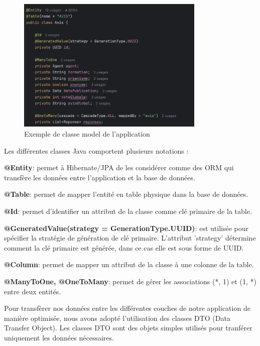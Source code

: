         \begin{figure}[h!]
            \centering
            \includegraphics[width=0.8\textwidth]{images/code/avisEntity.png}
            \caption{Exemple de classe model de l'application}
        \end{figure}\medskip

        Les différentes classes Java comportent plusieurs notations :
        \medskip
        
        \textbf{@Entity}: permet à Hibernate/JPA de les considérer comme des ORM qui transfère les données entre l'application et la base de données.
        \medskip

        \textbf{@Table}: permet de mapper l'entité en table physique dans la base de données.
        \medskip

        \textbf{@Id}: permet d'identifier un attribut de la classe comme clé primaire de la table.
        \medskip

        \textbf{@GeneratedValue(strategy = GenerationType.UUID)}: est utilisée pour spécifier la stratégie de génération de clé primaire. L'attribut 'strategy' détermine comment la clé primaire est générée, dans ce cas elle est sous forme de UUID.\medskip

        \textbf{@Column}: permet de mapper un attribut de la classe à une colonne de la table.
        \medskip

        \textbf{@ManyToOne, @OneToMany}: permet de gérer les associations (*, 1) et (1, *) entre deux entités.
        \vspace{1cm}

        Pour transfèrer nos données entre les différentes couches de notre application de manière optimisée, nous avons adopté l'utilisation des classes DTO (Data Transfer Object).
        Les classes DTO sont des objets simples utilisés pour tranférer uniquement les données nécessaires.\medskip

